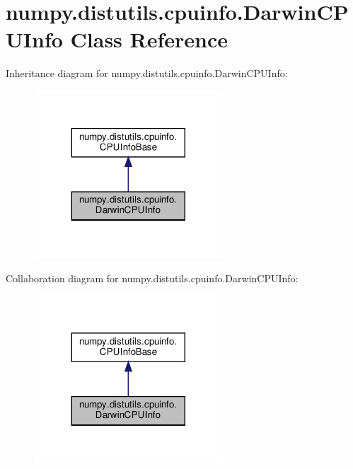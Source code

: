 \hypertarget{classnumpy_1_1distutils_1_1cpuinfo_1_1DarwinCPUInfo}{}\section{numpy.\+distutils.\+cpuinfo.\+Darwin\+C\+P\+U\+Info Class Reference}
\label{classnumpy_1_1distutils_1_1cpuinfo_1_1DarwinCPUInfo}


Inheritance diagram for numpy.\+distutils.\+cpuinfo.\+Darwin\+C\+P\+U\+Info\+:
\nopagebreak
\begin{figure}[H]
\begin{center}
\leavevmode
\includegraphics[width=200pt]{classnumpy_1_1distutils_1_1cpuinfo_1_1DarwinCPUInfo__inherit__graph}
\end{center}
\end{figure}


Collaboration diagram for numpy.\+distutils.\+cpuinfo.\+Darwin\+C\+P\+U\+Info\+:
\nopagebreak
\begin{figure}[H]
\begin{center}
\leavevmode
\includegraphics[width=200pt]{classnumpy_1_1distutils_1_1cpuinfo_1_1DarwinCPUInfo__coll__graph}
\end{center}
\end{figure}
